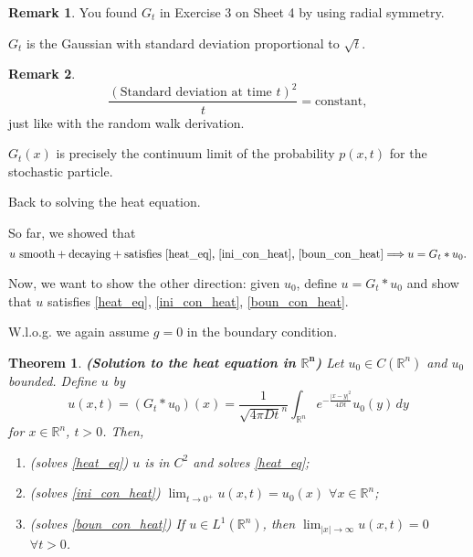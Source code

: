 \documentclass[12pt]{article}
\newtheorem{theorem}{Theorem}[section]
\theoremstyle{definition}
\newtheorem*{remark}{Remark}
\begin{document}
\begin{remark}
You found $G_t$ in Exercise 3 on Sheet 4 by using radial symmetry.
\end{remark}

$G_t$ is the Gaussian with standard deviation proportional to $\sqrt{t}$.

\begin{remark}
\[\frac{(\text{Standard deviation at time }t)^2}{t}=\text{constant},\]
just like with the random walk derivation.

$G_t(x)$ is precisely the continuum limit of the probability $p(x,t)$ for the stochastic particle.
\end{remark}

Back to solving the heat equation.

So far, we showed that
\[u\text{ smooth}+\text{decaying}+\text{satisfies \eqref{heat_eq}, \eqref{ini_con_heat}, \eqref{boun_con_heat}}\Longrightarrow u=G_t*u_0.\]

Now, we want to show the other direction: given $u_0$, define $u=G_t*u_0$ and show that $u$ satisfies \eqref{heat_eq}, \eqref{ini_con_heat}, \eqref{boun_con_heat}.

W.l.o.g. we again assume $g=0$ in the boundary condition.

\begin{theorem}\label{th_sol_heat}
\emph{\textbf{(Solution to the heat equation in $\boldsymbol{\mathbb{R}^n}$)}} Let $u_0\in C(\mathbb{R}^n)$ and $u_0$ bounded. Define $u$ by
\[u(x,t)=(G_t*u_0)(x)=\frac{1}{\sqrt{4\pi Dt}^n}\int_{\mathbb{R}^n}e^{-\frac{|x-y|^2}{4Dt}}u_0(y)\,dy\]
for $x\in\mathbb{R}^n$, $t>0$. Then,
\begin{enumerate}[label=(\arabic*)]
\item (solves \eqref{heat_eq}) $u$ is in $C^2$ and solves \eqref{heat_eq};
\item (solves \eqref{ini_con_heat}) $\displaystyle{\lim_{t\to0^+}u(x,t)=u_0(x)}$ $\forall x\in\mathbb{R}^n$;
\item  (solves \eqref{boun_con_heat}) If $u\in L^1(\mathbb{R}^n)$, then $\displaystyle{\lim_{|x|\to\infty}u(x,t)=0}$ $\forall t>0$.
\end{enumerate}
\end{theorem}
\end{document}
